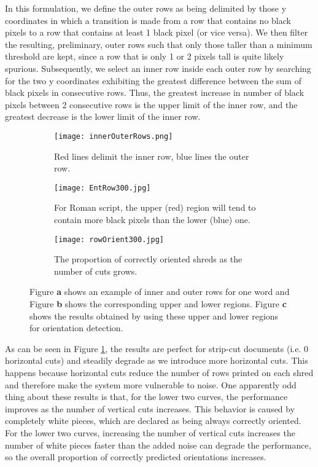 \documentclass{llncs}
\begin{document}
In this formulation, we define the outer rows as being delimited by those y coordinates in which a transition is made from a row that contains no black pixels to a row that contains at least 1 black pixel (or vice versa). We then filter the resulting, preliminary, outer rows such that only those taller than a minimum threshold are kept, since a row that is only 1 or 2 pixels tall is quite likely spurious. Subsequently, we select an inner row inside each outer row by searching for the two y coordinates exhibiting the greatest difference between the sum of black pixels in consecutive rows. Thus, the greatest increase in number of black pixels between 2 consecutive rows is the upper limit of the inner row, and the greatest decrease is the lower limit of the inner row. 

\begin{figure}[t]
    \setlength{\abovecaptionskip}{4pt plus 1.0pt minus 2.0pt}
    \begin{minipage}[b]{0.44\textwidth}
        \begin{subfigure}[b]{\textwidth}
          \texttt{[image: innerOuterRows.png]}
          \caption{Red lines delimit the inner row, blue lines the outer row.}
        \end{subfigure}
        \vspace{1em}

        \begin{subfigure}[b]{\textwidth}
          \texttt{[image: EntRow300.jpg]}
          \caption{For Roman script, the upper (red) region will tend to contain more black pixels than the lower (blue) one.}
        \end{subfigure}
     \end{minipage}
      \hfill
    \begin{subfigure}[b]{0.48\textwidth}
        \texttt{[image: rowOrient300.jpg]}
        \caption{The proportion of correctly oriented shreds as the number of cuts grows.}
    \end{subfigure}

     \caption{Figure {\bf a} shows an example of inner and outer rows for one word and Figure {\bf b} shows the corresponding upper and lower regions. Figure {\bf c} shows the results obtained by using these upper and lower regions for orientation detection.}
    \label{fig:rowOrient}
\end{figure}

As can be seen in Figure \ref{fig:rowOrient}, the results are perfect for strip-cut documents (i.e. 0 horizontal cuts) and steadily degrade as we introduce more horizontal cuts. This happens because horizontal cuts reduce the number of rows printed on each shred and therefore make the system more vulnerable to noise. One apparently odd thing about these results is that, for the lower two curves, the performance improves as the number of vertical cuts increases. This behavior is caused by completely white pieces, which are declared as being always correctly oriented. For the lower two curves, increasing the number of vertical cuts increases the number of white pieces faster than the added noise can degrade the performance, so the overall proportion of correctly predicted orientations increases.
\end{document}
